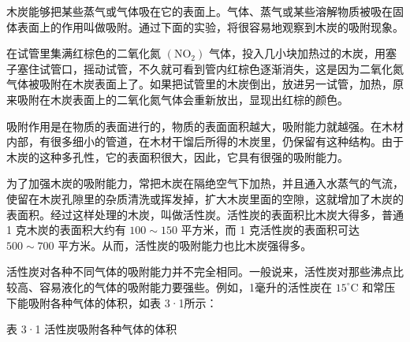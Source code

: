 木炭能够把某些蒸气或气体吸在它的表面上。气体、蒸气或某些溶解物质被吸在固体表面上的作用叫做吸附。通过下面的实验，将很容易地观察到木炭的吸附现象。

在试管里集满红棕色的二氧化氮 \(\left(\mathrm{NO}_{2}\right)\)
气体，投入几小块加热过的木炭，用塞子塞住试管口，摇动试管，不久就可看到管内红棕色逐渐消失，这是因为二氧化氮气体被吸附在木炭表面上了。如果把试管里的木炭倒出，放进另一试管，加热，原来吸附在木炭表面上的二氧化氮气体会重新放出，显现出红棕的颜色。

吸附作用是在物质的表面进行的，物质的表面面积越大，吸附能力就越强。在木材内部，有很多细小的管道，在木材干馏后所得的木炭里，仍保留有这种结构。由于木炭的这种多孔性，它的表面积很大，因此，它具有很强的吸附能力。

为了加强木炭的吸附能力，常把木炭在隔绝空气下加热，并且通入水蒸气的气流，使留在木炭孔隙里的杂质清洗或挥发掉，扩大木炭里面的空隙，这就增加了木炭的表面积。经过这样处理的木炭，叫做活性炭。活性炭的表面积比木炭大得多，普通
1 克木炭的表面积大约有 \(100 \sim 150\) 平方米，而 1
克活性炭的表面积可达 \(500 \sim 700\)
平方米。从而，活性炭的吸附能力也比木炭强得多。

活性炭对各种不同气体的吸附能力并不完全相同。一般说来，活性炭对那些沸点比较高、容易液化的气体的吸附能力要强些。例如，1毫升的活性炭在
\(15^{\circ}\mathrm{C}\) 和常压下能吸附各种气体的体积，如表 3·1所示：

表 3·1 活性炭吸附各种气体的体积

